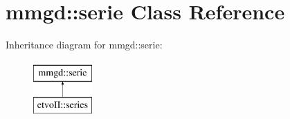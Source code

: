 \hypertarget{classmmgd_1_1serie}{}\section{mmgd\+:\+:serie Class Reference}
\label{classmmgd_1_1serie}
Inheritance diagram for mmgd\+:\+:serie\+:\begin{figure}[H]
\begin{center}
\leavevmode
\includegraphics[height=2.000000cm]{classmmgd_1_1serie}
\end{center}
\end{figure}
